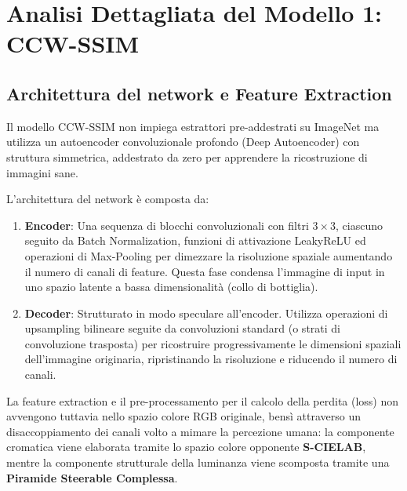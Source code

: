 \section{Analisi Dettagliata del Modello 1: CCW-SSIM}

\subsection{Architettura del network e Feature Extraction}
Il modello CCW-SSIM non impiega estrattori pre-addestrati su ImageNet ma utilizza un autoencoder convoluzionale profondo (Deep Autoencoder) con struttura simmetrica, addestrato da zero per apprendere la ricostruzione di immagini sane. 

L'architettura del network è composta da:
\begin{enumerate}
    \item \textbf{Encoder}: Una sequenza di blocchi convoluzionali con filtri $3 \times 3$, ciascuno seguito da Batch Normalization, funzioni di attivazione LeakyReLU ed operazioni di Max-Pooling per dimezzare la risoluzione spaziale aumentando il numero di canali di feature. Questa fase condensa l'immagine di input in uno spazio latente a bassa dimensionalità (collo di bottiglia).
    \item \textbf{Decoder}: Strutturato in modo speculare all'encoder. Utilizza operazioni di upsampling bilineare seguite da convoluzioni standard (o strati di convoluzione trasposta) per ricostruire progressivamente le dimensioni spaziali dell'immagine originaria, ripristinando la risoluzione e riducendo il numero di canali.
\end{enumerate}

La feature extraction e il pre-processamento per il calcolo della perdita (loss) non avvengono tuttavia nello spazio colore RGB originale, bensì attraverso un disaccoppiamento dei canali volto a mimare la percezione umana: la componente cromatica viene elaborata tramite lo spazio colore opponente \textbf{S-CIELAB}, mentre la componente strutturale della luminanza viene scomposta tramite una \textbf{Piramide Steerable Complessa}.

